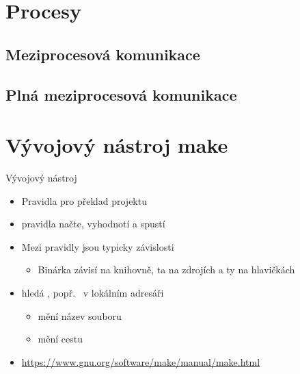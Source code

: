 


\section{Procesy}
\frame{\sectionpage}




\subsection*{Meziprocesová komunikace}
\frame{\subsectionpage}




\subsection*{Plná meziprocesová komunikace}
\frame{\subsectionpage}



\section{Vývojový nástroj make}
\frame{\sectionpage}

\begin{frame}{Vývojový nástroj }

  \begin{itemize}
    \item Pravidla pro překlad projektu
    \item {} pravidla načte, vyhodnotí a spustí

    \pause

    \item Mezi pravidly jsou typicky závislosti
    \begin{itemize}
      \item Binárka závisí na knihovně, ta na zdrojích a ty na hlavičkách
    \end{itemize}

    \pause

    \item {} hledá , popř.\  v lokálním
      adresáři
    \begin{itemize}
      \item {} mění název souboru
      \item {} mění cestu
    \end{itemize}

    \pause

    \item \url{https://www.gnu.org/software/make/manual/make.html}
  \end{itemize}

\end{frame}

